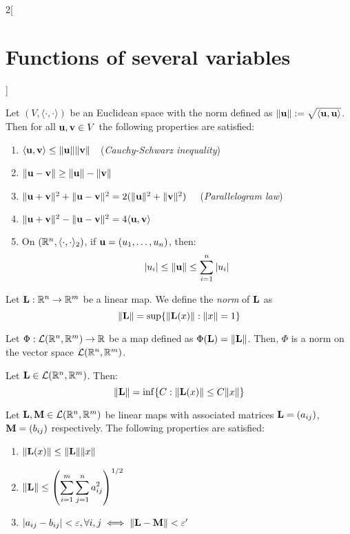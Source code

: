 \documentclass[../../../main.tex]{subfiles}
\begin{document}
\begin{multicols}{2}[\section{Functions of several variables}]
\begin{corollary}
  \end{corollary}
  \begin{proposition}
    Let $(V,\langle\cdot,\cdot\rangle)$ be an Euclidean space with the norm defined as $\|\boldsymbol{\mathrm{u}}\|:=\sqrt{\langle \boldsymbol{\mathrm{u}},\boldsymbol{\mathrm{u}}\rangle}$. Then for all $\boldsymbol{\mathrm{u}},\boldsymbol{\mathrm{v}}\in V$ the following properties are satisfied:
    \begin{enumerate}
      \item $\langle \boldsymbol{\mathrm{u}},\boldsymbol{\mathrm{v}}\rangle\leq\|\boldsymbol{\mathrm{u}}\|\|\boldsymbol{\mathrm{v}}\|\quad$(\emph{Cauchy-Schwarz inequality})
      \item $\|\boldsymbol{\mathrm{u}}-\boldsymbol{\mathrm{v}}\|\geq\|\boldsymbol{\mathrm{u}}\|-\|\boldsymbol{\mathrm{v}}\|$
      \item $\|\boldsymbol{\mathrm{u}}+\boldsymbol{\mathrm{v}}\|^2+\|\boldsymbol{\mathrm{u}}-\boldsymbol{\mathrm{v}}\|^2=2(\|\boldsymbol{\mathrm{u}}\|^2+\|\boldsymbol{\mathrm{v}}\|^2)\quad$ (\emph{Parallelogram law})
      \item $\|\boldsymbol{\mathrm{u}}+\boldsymbol{\mathrm{v}}\|^2-\|\boldsymbol{\mathrm{u}}-\boldsymbol{\mathrm{v}}\|^2=4\langle \boldsymbol{\mathrm{u}},\boldsymbol{\mathrm{v}}\rangle$
      \item On $(\mathbb{R}^n,\langle\cdot,\cdot\rangle_2)$, if $\boldsymbol{\mathrm{u}}=(u_1,\ldots,u_n)$, then: $$|u_i|\leq\|\boldsymbol{\mathrm{u}}\|\leq\sum_{i=1}^n|u_i|$$
    \end{enumerate}
  \end{proposition}
  \begin{definition}
    Let $\boldsymbol{\mathrm{L}}:\mathbb{R}^n\rightarrow\mathbb{R}^m$ be a linear map. We define the \emph{norm} of $\boldsymbol{\mathrm{L}}$ as $$\|\boldsymbol{\mathrm{L}}\|=\sup\{\|\boldsymbol{\mathrm{L}}(x)\|:\|x\|=1\}$$
  \end{definition}
  \begin{lemma}
    Let $\Phi:\mathcal{L}(\mathbb{R}^n,\mathbb{R}^m)\rightarrow\mathbb{R} $ be a map defined as $\Phi(\boldsymbol{\mathrm{L}})=\|\boldsymbol{\mathrm{L}}\|$. Then, $\Phi$ is a norm on the vector space $\mathcal{L}(\mathbb{R}^n,\mathbb{R}^m)$.
  \end{lemma}
  \begin{proposition}
    Let $\boldsymbol{\mathrm{L}}\in\mathcal{L}(\mathbb{R}^n,\mathbb{R}^m)$. Then: $$\|\boldsymbol{\mathrm{L}}\|=\inf\{C:\|\boldsymbol{\mathrm{L}}(x)\|\leq C\|x\|\}$$
  \end{proposition}
  \begin{corollary}
    Let $\boldsymbol{\mathrm{L}},\boldsymbol{\mathrm{M}}\in\mathcal{L}(\mathbb{R}^n,\mathbb{R}^m)$ be linear maps with associated matrices $\boldsymbol{\mathrm{L}}=(a_{ij})$, $\boldsymbol{\mathrm{M}}=(b_{ij})$ respectively. The following properties are satisfied:
    \begin{enumerate}
      \item $\|\boldsymbol{\mathrm{L}}(x)\|\leq\|\boldsymbol{\mathrm{L}}\|\|x\|$
      \item $\displaystyle\|\boldsymbol{\mathrm{L}}\|\leq{\left(\sum_{i=1}^m\sum_{j=1}^na_{ij}^2\right)}^{1/2}$
      \item $|a_{ij}-b_{ij}|<\varepsilon,\forall i,j\iff\|\boldsymbol{\mathrm{L}}-\boldsymbol{\mathrm{M}}\|<\varepsilon'$

\end{enumerate}
\end{corollary}
\end{multicols}
\end{document}
